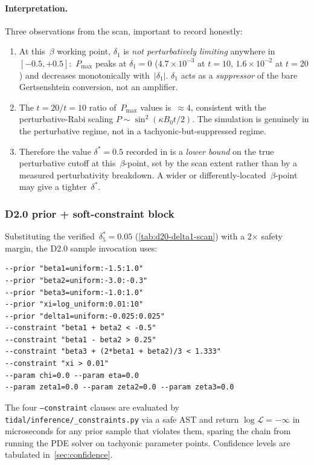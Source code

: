 \paragraph{Interpretation.}
Three observations from the scan, important to record honestly:
\begin{enumerate}
  \item At this~$\beta$ working point, $\delta_1$ is \emph{not perturbatively
    limiting} anywhere in $[-0.5, +0.5]$:~$P_\mathrm{max}$ peaks at $\delta_1=0$
    ($4.7\times10^{-3}$ at $t=10$, $1.6\times10^{-2}$ at $t=20$) and decreases
    monotonically with~$|\delta_1|$.  $\delta_1$ acts as a \emph{suppressor}
    of the bare Gertsenshtein conversion, not an amplifier.
  \item The $t=20 / t=10$ ratio of~$P_\mathrm{max}$ values is~$\approx 4$,
    consistent with the perturbative-Rabi scaling
    $P \sim \sin^2(\kappa B_0 t/2)$.  The simulation is genuinely in the
    perturbative regime, not in a tachyonic-but-suppressed regime.
  \item Therefore the value $\delta^* = 0.5$ recorded in
     is a \emph{lower bound} on the
    true perturbative cutoff at this~$\beta$-point, set by the scan extent
    rather than by a measured perturbativity breakdown.  A wider or
    differently-located~$\beta$-point may give a tighter~$\delta^*$.
\end{enumerate}

\subsubsection*{D2.0 prior + soft-constraint block}

Substituting the verified~$\delta^*_5 = 0.05$ (\cref{tab:d20-delta1-scan})
with a 2$\times$ safety margin, the D2.0 sample invocation uses:
\begin{lstlisting}[basicstyle=\ttfamily\small]
--prior "beta1=uniform:-1.5:1.0"
--prior "beta2=uniform:-3.0:-0.3"
--prior "beta3=uniform:-1.0:1.0"
--prior "xi=log_uniform:0.01:10"
--prior "delta1=uniform:-0.025:0.025"
--constraint "beta1 + beta2 < -0.5"
--constraint "beta1 - beta2 > 0.25"
--constraint "beta3 + (2*beta1 + beta2)/3 < 1.333"
--constraint "xi > 0.01"
--param chi=0.0 --param eta=0.0
--param zeta1=0.0 --param zeta2=0.0 --param zeta3=0.0
\end{lstlisting}
The four \texttt{--constraint} clauses are evaluated by
\texttt{tidal/inference/\_constraints.py} via a safe AST and return
$\log\mathcal{L}=-\infty$ in microseconds for any prior sample that violates
them, sparing the chain from running the PDE solver on tachyonic parameter
points.  Confidence levels are tabulated in~\cref{sec:confidence}.

